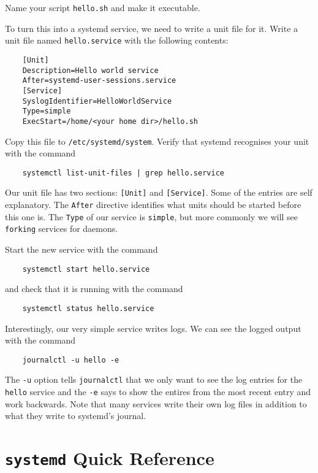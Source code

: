 \documentclass{article}
\begin{document}
Name your script \texttt{hello.sh} and make it executable.

To turn this into a systemd service, we need to write a unit file for it. Write a unit file named \texttt{hello.service} with the following contents:

\begin{verbatim}
    [Unit]
    Description=Hello world service
    After=systemd-user-sessions.service
    [Service]
    SyslogIdentifier=HelloWorldService
    Type=simple
    ExecStart=/home/<your home dir>/hello.sh
\end{verbatim}

Copy this file to \texttt{/etc/systemd/system}. Verify that systemd recognises your unit with the command
\begin{verbatim}
    systemctl list-unit-files | grep hello.service
\end{verbatim}

Our unit file has two sections: \texttt{[Unit]} and \texttt{[Service]}. Some of the entries are self explanatory. The \texttt{After} directive identifies what units should be started before this one is. The \texttt{Type} of our service is \texttt{simple}, but more commonly we will see \texttt{forking} services for daemons.

Start the new service with the command 

\begin{verbatim}
    systemctl start hello.service
\end{verbatim}

and check that it is running with the command

\begin{verbatim}
    systemctl status hello.service
\end{verbatim}

Interestingly, our very simple service writes logs. We can see the logged output with the command

\begin{verbatim}
    journalctl -u hello -e
\end{verbatim}

The \texttt{-u} option tells \texttt{journalctl} that we only want to see the log entries for the \texttt{hello} service and the \texttt{-e} says to show the entires from the most recent entry and work backwards. Note that many services write their own log files in addition to what they write to systemd's journal.

\section{\texttt{systemd} Quick Reference}
\end{document}
